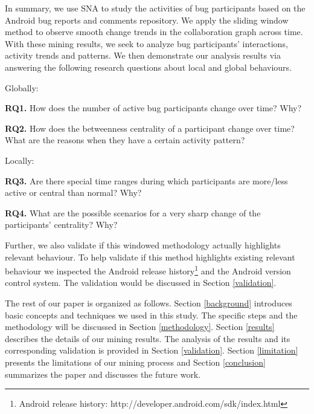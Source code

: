 \documentclass[conference]{IEEEtran}
\begin{document}
In summary, we use SNA to study the activities of bug
participants based on the Android bug reports and comments
repository. 
We apply the sliding window method to observe smooth change trends
in the collaboration graph across time.
With these mining results, we seek to analyze bug participants'
interactions, activity trends and patterns. 
We then demonstrate our analysis results via answering the following
research questions about local and global behaviours.


Globally:

\textbf{RQ1.} How does the number of active bug participants change over
  time? Why?

\textbf{RQ2.} How does the betweenness centrality of a participant change over
time? What are the reasons when they have a certain activity pattern?

Locally:

\textbf{RQ3.} Are there special time ranges during which participants are more/less
active or central than normal? Why?

\textbf{RQ4.} What are the possible scenarios for a very sharp change of the
participants' centrality? Why?

Further, we also validate if this windowed methodology actually
highlights relevant behaviour.
To help validate if this method highlights existing relevant behaviour 
we inspected the Android release
history\footnote[1]{Android release history:
  http://developer.android.com/sdk/index.html} and the Android version
control system.
The validation would be discussed in Section
\ref{validation}.
 

% 
The rest of our paper is organized as follows. 
Section \ref{background} introduces basic concepts and techniques we
used in this study. 
The specific steps and the methodology will be discussed in Section
\ref{methodology}. 
Section \ref{results} describes the details of our mining results. 
The analysis of the results and its corresponding validation is
provided in Section \ref{validation}. 
Section \ref{limitation} presents the limitations of our mining
process and Section \ref{conclusion} summarizes the paper and
discusses the future work.

\end{document}
